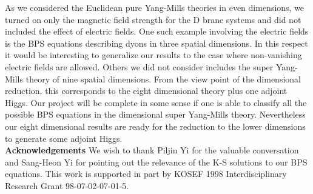 \documentclass[a4paper,11pt]{article}
\begin{document}
As we considered  the Euclidean pure Yang-Mills theories in even dimensions, we turned on only the magnetic field
strength for the D brane systems and  did not included the effect of electric fields. One such example involving the
electric fields  is the BPS equations describing dyons in three spatial dimensions.  In this respect it would be
interesting to generalize our results to the case where non-vanishing electric fields are allowed. Others we did not
consider includes  the super Yang-Mills theory of nine spatial dimensions.  From the view point of the dimensional
reduction, this corresponds to the eight dimensional theory plus one adjoint Higgs. Our project will be complete  in some
sense if one is able to classify all the possible  BPS equations in  the \coordHE{} dimensional super Yang-Mills theory.
Nevertheless our eight dimensional results are ready for the reduction to the lower dimensions to generate some adjoint
Higgs.\\

{\large\bf Acknowledgements} We  wish to thank Piljin Yi for the valuable conversation and  Sang-Heon Yi for pointing out
the relevance of the K-S solutions to our BPS equations. This work is supported in part by KOSEF 1998 Interdisciplinary
Research Grant 98-07-02-07-01-5.
\end{document}
